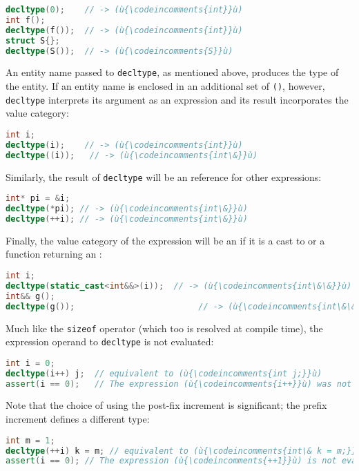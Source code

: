 \begin{lstlisting}[language=C++]
decltype(0);    // -> (ù{\codeincomments{int}}ù)
int f();
decltype(f());  // -> (ù{\codeincomments{int}}ù)
struct S{};
decltype(S());  // -> (ù{\codeincomments{S}}ù)
\end{lstlisting}

\noindent An entity name passed to \lstinline!decltype!, as mentioned above, produces the type of the entity. If an entity name is enclosed in an additional set of \lstinline!()!, however, \lstinline!decltype! interprets its argument as an expression and its result incorporates the value category:

\begin{lstlisting}[language=C++]
int i;
decltype(i);    // -> (ù{\codeincomments{int}}ù)
decltype((i));   // -> (ù{\codeincomments{int\&}}ù)
\end{lstlisting}

\noindent Similarly, the result of \lstinline!decltype! will be an  reference for other  expressions:

\begin{lstlisting}[language=C++]
int* pi = &i;
decltype(*pi); // -> (ù{\codeincomments{int\&}}ù)
decltype(++i); // -> (ù{\codeincomments{int\&}}ù)
\end{lstlisting}

\noindent Finally, the value category of the expression will be an  if it is a cast to or a function returning an :

\begin{lstlisting}[language=C++]
int i;
decltype(static_cast<int&&>(i));  // -> (ù{\codeincomments{int\&\&}}ù)
int&& g();
decltype(g());                         // -> (ù{\codeincomments{int\&\&}}ù)
\end{lstlisting}


\noindent Much like the \lstinline!sizeof!
operator (which too is resolved at compile time), the expression operand to \lstinline!decltype! is not evaluated:

\begin{lstlisting}[language=C++]
int i = 0;
decltype(i++) j;  // equivalent to (ù{\codeincomments{int j;}}ù)
assert(i == 0);   // The expression (ù{\codeincomments{i++}}ù) was not evaluated.
\end{lstlisting}
Note that the choice of using the post-fix increment is significant; the prefix increment defines a different type:
\begin{lstlisting}[language=C++]
int m = 1;
decltype(++i) k = m; // equivalent to (ù{\codeincomments{int\& k = m;}}ù)
assert(i == 0); // The expression (ù{\codeincomments{++1}}ù) is not evaluated.
\end{lstlisting}

